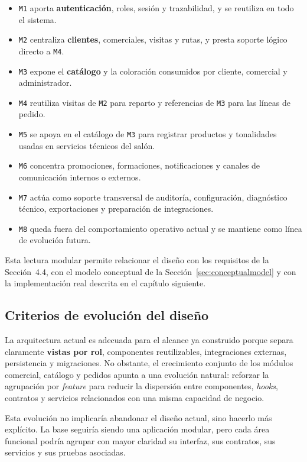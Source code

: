 \begin{itemize}
    \item \texttt{M1} aporta \textbf{autenticación}, roles, sesión y trazabilidad, y se reutiliza en todo el sistema.
    \item \texttt{M2} centraliza \textbf{clientes}, comerciales, visitas y rutas, y presta soporte lógico directo a \texttt{M4}.
    \item \texttt{M3} expone el \textbf{catálogo} y la coloración consumidos por cliente, comercial y administrador.
    \item \texttt{M4} reutiliza visitas de \texttt{M2} para reparto y referencias de \texttt{M3} para las líneas de pedido.
    \item \texttt{M5} se apoya en el catálogo de \texttt{M3} para registrar productos y tonalidades usadas en servicios técnicos del salón.
    \item \texttt{M6} concentra promociones, formaciones, notificaciones y canales de comunicación internos o externos.
    \item \texttt{M7} actúa como soporte transversal de auditoría, configuración, diagnóstico técnico, exportaciones y preparación de integraciones.
    \item \texttt{M8} queda fuera del comportamiento operativo actual y se mantiene como línea de evolución futura.
\end{itemize}

Esta lectura modular permite relacionar el diseño con los requisitos de la Sección~4.4, con el modelo conceptual de la Sección~\ref{sec:conceptualmodel} y con la implementación real descrita en el capítulo siguiente.

\subsection{Criterios de evolución del diseño}

La arquitectura actual es adecuada para el alcance ya construido porque separa claramente \textbf{vistas por rol}, componentes reutilizables, integraciones externas, persistencia y migraciones. No obstante, el crecimiento conjunto de los módulos comercial, catálogo y pedidos apunta a una evolución natural: reforzar la agrupación por \textit{feature} para reducir la dispersión entre componentes, \textit{hooks}, contratos y servicios relacionados con una misma capacidad de negocio.

Esta evolución no implicaría abandonar el diseño actual, sino hacerlo más explícito. La base seguiría siendo una aplicación modular, pero cada área funcional podría agrupar con mayor claridad su interfaz, sus contratos, sus servicios y sus pruebas asociadas.
